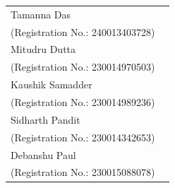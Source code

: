 \def\studentNameTwo{Student Name 2}
\def\studentRegTwo{XXXXXXXXXXX}

\def\studentNameThree{Student Name 3}
\def\studentRegThree{XXXXXXXXXXX}

\def\studentNameFour{Student Name 4}
\def\studentRegFour{XXXXXXXXXXX}

\def\studentNameFive{Student Name 5}
\def\studentRegFive{XXXXXXXXXXX}




\vspace{1cm}
\begin{tabular}{p{7cm}p{8cm}}

\noindent Tamanna Das\\
(Registration No.: 240013403728) \dotfill\\[6pt]

\noindent Mitudru Dutta\\
(Registration No.: 230014970503) \dotfill\\[6pt]

\noindent Kaushik Samadder\\
(Registration No.: 230014989236) \dotfill\\[6pt]

\noindent Sidharth Pandit\\
(Registration No.: 230014342653) \dotfill\\[6pt]

\noindent Debanshu Paul\\
(Registration No.: 230015088078) \dotfill



\end{tabular}
